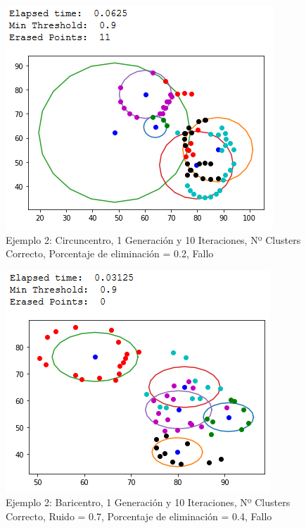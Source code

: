 \documentclass[conference,a4paper]{IEEEtran}
\begin{document}
\begin{figure}[H]
\centering
\includegraphics[scale=0.65]{Experimentacion/Ejemplo2/ej2_c_1_10_le_wrong}
\caption{Ejemplo 2: Circuncentro, 1 Generación y 10 Iteraciones,  Nº Clusters Correcto, Porcentaje de eliminación = 0.2, Fallo\\}
\end{figure}

\begin{figure}[H]
\centering
\includegraphics[scale=0.65]{Experimentacion/Ejemplo2/ej2_b_1_10_re_wrong}
\caption{Ejemplo 2: Baricentro, 1 Generación y 10 Iteraciones,  Nº Clusters Correcto, Ruido = 0.7, Porcentaje de eliminación = 0.4, Fallo\\}
\end{figure}
\end{document}
